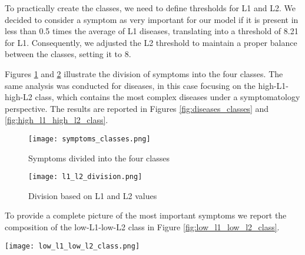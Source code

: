 To practically create the classes, we need to define thresholds for L1 and L2. We decided to consider 
a symptom as very important for our model if it is present in less than 0.5 times the average of L1 diseases, 
translating into a threshold of 8.21 for L1. Consequently, we adjusted the L2 threshold to maintain a proper balance 
between the classes, setting it to 8.

Figures \ref{fig:symptoms_classes} and \ref{fig:l1_l2_division} illustrate the division of symptoms into the four classes.
The same analysis was conducted for diseases, in this case focusing on the high-L1-high-L2 class, which contains
the most complex diseases under a symptomatology perspective. The results are reported in Figures \ref{fig:diseases_classes}
and \ref{fig:high_l1_high_l2_class}.\\
    

\begin{figure}[H]
    \centering
    \texttt{[image: symptoms\_classes.png]}
    \caption{Symptoms divided into the four classes}
    \label{fig:symptoms_classes}
\end{figure}

\begin{figure}[H]
    \centering
    \texttt{[image: l1\_l2\_division.png]}
    \caption{Division based on L1 and L2 values}
    \label{fig:l1_l2_division}
\end{figure}
\noindent

\noindent
To provide a complete picture of the most important symptoms we report the composition of the low-L1-low-L2 class
in Figure \ref{fig:low_l1_low_l2_class}.\\

\begin{figure*}[!t]
    \centering
    \texttt{[image: low\_l1\_low\_l2\_class.png]}
    \caption{Composition of the low-L1-low-L2 class for symptoms}
    \label{fig:low_l1_low_l2_class}
\end{figure*}






